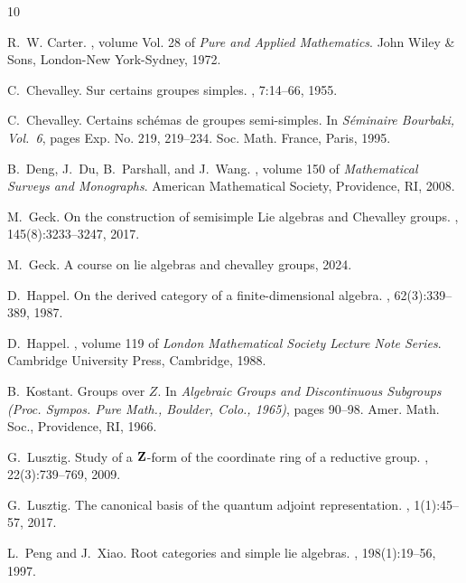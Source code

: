 \documentclass[12pt]{amsart}
\begin{document}
\begin{thebibliography}{10}

R.~W. Carter.
, volume Vol. 28 of {\em Pure and
  Applied Mathematics}.
\newblock John Wiley \& Sons, London-New York-Sydney, 1972.

C.~Chevalley.
\newblock Sur certains groupes simples.
, 7:14--66, 1955.

C.~Chevalley.
\newblock Certains sch\'emas de groupes semi-simples.
\newblock In {\em S\'eminaire {B}ourbaki, {V}ol.\ 6}, pages Exp. No. 219,
  219--234. Soc. Math. France, Paris, 1995.

B.~Deng, J.~Du, B.~Parshall, and J.~Wang.
, volume 150 of
  {\em Mathematical Surveys and Monographs}.
\newblock American Mathematical Society, Providence, RI, 2008.

M.~Geck.
\newblock On the construction of semisimple {L}ie algebras and {C}hevalley
  groups.
, 145(8):3233--3247, 2017.

M.~Geck.
\newblock A course on lie algebras and chevalley groups, 2024.

D.~Happel.
\newblock On the derived category of a finite-dimensional algebra.
, 62(3):339--389, 1987.

D.~Happel.
, volume 119 of {\em London Mathematical Society
  Lecture Note Series}.
\newblock Cambridge University Press, Cambridge, 1988.

B.~Kostant.
\newblock Groups over {$Z$}.
\newblock In {\em Algebraic {G}roups and {D}iscontinuous {S}ubgroups ({P}roc.
  {S}ympos. {P}ure {M}ath., {B}oulder, {C}olo., 1965)}, pages 90--98. Amer.
  Math. Soc., Providence, RI, 1966.

G.~Lusztig.
\newblock Study of a {$\bold Z$}-form of the coordinate ring of a reductive
  group.
, 22(3):739--769, 2009.

G.~Lusztig.
\newblock The canonical basis of the quantum adjoint representation.
, 1(1):45--57, 2017.

L.~Peng and J.~Xiao.
\newblock Root categories and simple lie algebras.
, 198(1):19--56, 1997.


\end{thebibliography}
\end{document}

